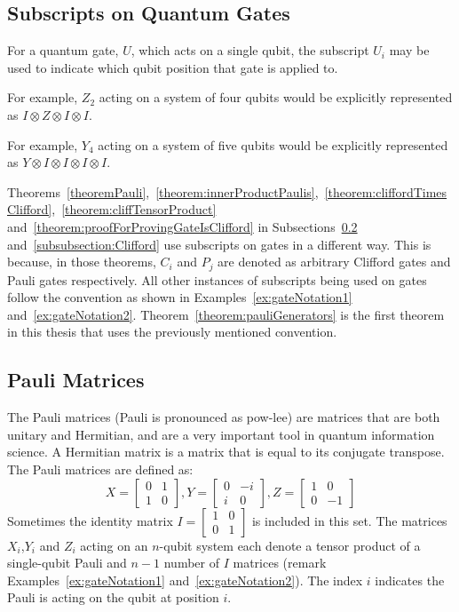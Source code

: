 \subsection{Subscripts on Quantum Gates}
For a quantum gate, $U$, which acts on a single qubit, the subscript $U_i$ may be used to indicate which qubit position that gate is applied to. 
\begin{example}
\label{ex:gateNotation1}
For example, $Z_2$ acting on a system of four qubits would be explicitly represented as $I \otimes Z \otimes I \otimes I$.
\end{example}
\begin{example}
\label{ex:gateNotation2}
For example, $Y_4$ acting on a system of five qubits would be explicitly represented as $Y \otimes I \otimes I \otimes I \otimes I$.
\end{example}
Theorems~\ref{theoremPauli},~\ref{theorem:innerProductPaulis},~\ref{theorem:cliffordTimesClifford},~\ref{theorem:cliffTensorProduct} and~\ref{theorem:proofForProvingGateIsClifford} in Subsections~\ref{subsubsection:paulis} and~\ref{subsubsection:Clifford} use subscripts on gates in a different way. This is because, in those theorems, $C_i$ and $P_j$ are denoted as arbitrary Clifford gates and Pauli gates respectively. All other instances of subscripts being used on gates follow the convention as shown in Examples~\ref{ex:gateNotation1} and~\ref{ex:gateNotation2}. Theorem~\ref{theorem:pauliGenerators} is the first theorem in this thesis that uses the previously mentioned convention.

\subsection{Pauli Matrices}
\label{subsubsection:paulis}
The Pauli matrices (Pauli is pronounced as pow-lee) are matrices that are both unitary and Hermitian, and are a very important tool in quantum information science. A Hermitian matrix is a matrix that is equal to its conjugate transpose. The Pauli matrices are defined as:
$$X = \begin{bmatrix} 0 & 1 \\ 1 & 0\end{bmatrix}, Y = \begin{bmatrix} 0 & -i \\ i & 0\end{bmatrix}, Z =  \begin{bmatrix} 1 & 0 \\ 0 & -1\end{bmatrix}$$
Sometimes the identity matrix $I = \begin{bmatrix} 1 & 0 \\ 0 & 1\end{bmatrix}$ is included in this set. The matrices $X_i$,$Y_i$ and $Z_i$ acting on an $n$-qubit system each denote a tensor product of a single-qubit Pauli and $n-1$ number of $I$ matrices (remark Examples~\ref{ex:gateNotation1} and~\ref{ex:gateNotation2}). The index $i$ indicates the Pauli is acting on the qubit at position $i$.

